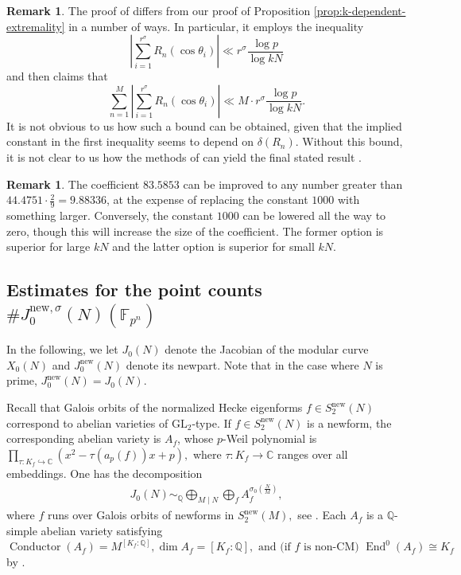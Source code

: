 \documentclass[11pt,letterpaper,reqno]{amsart}
\theoremstyle{definition}
\newtheorem{remark}[theorem]{Remark}
\numberwithin{equation}{section}
\numberwithin{figure}{section}
\numberwithin{table}{section}
\let\subsectiontemp\subsection
\renewcommand{\subsection}[1]{ 
    \subsectiontemp{#1} \hfill\vspace{0.5\linespacing} 
}
\newcommand{\nw}{\mathrm{new}}
\begin{document}
\begin{remark}
    The proof of \cite[Theorem 2.4]{Kim24} differs from our proof of Proposition \ref{prop:k-dependent-extremality} in a number of ways. In particular, it employs the inequality
    $$\left| \sum_{i = 1}^{r^\sigma} R_n(\cos \theta_i) \right| \ll r^\sigma  \frac{\log p}{\log kN}$$
    and then claims that
    $$\sum_{n = 1}^{M} \left| \sum_{i = 1}^{r^\sigma} R_n(\cos \theta_i)  \right| \ll M \cdot r^\sigma \frac{\log p}{\log kN}.$$
    It is not obvious to us how such a bound can be obtained, given that the implied constant in the first inequality seems to depend on $\delta(R_n)$. Without this bound, it is not clear to us how the methods of \cite{Kim24} can yield the final stated result \cite[Theorem 2.4]{Kim24}.
\end{remark}

\begin{remark}
    The coefficient $83.5853$ can be improved to any number greater than $44.4751 \cdot \frac{2}{9} = 9.88336$, at the expense of replacing the constant $1000$ with something larger. Conversely, the constant $1000$ can be lowered all the way to zero, though this will increase the size of the coefficient. The former option is superior for large $kN$ and the latter option is superior for small $kN.$
\end{remark}


\subsection{Estimates for the point counts \texorpdfstring{$\#J_0^{\nw,\sigma}(N)(\mathbb{F}_{p^n})$}{J-0-sigma(N)(F-p-n)}} \label{subsection:point-count}

In the following, we let $J_0(N)$ denote the Jacobian of the modular curve $X_0(N)$ and $J_0^{\nw}(N)$ denote its newpart. Note that in the case where $N$ is prime, $J_0^{\nw}(N) = J_0 (N)$.  

Recall that Galois orbits of the normalized Hecke eigenforms $f \in S_2^{\mathrm{new}}(N)$ correspond to abelian varieties of $\mathrm{GL}_2$-type. If $f \in S_2^{\mathrm{new}}(N)$ is a newform, the corresponding abelian variety is $A_f$, whose $p$-Weil polynomial is
$
\prod_{\tau : K_f \hookrightarrow \mathbb{C}}
\left(x^2-\tau(a_p(f))x+p\right),
$
where $\tau : K_f \to \mathbb{C}$ ranges over all embeddings. One has the decomposition
\begin{align}\label{eqn:composite-jacobian-decomp}
J_0(N)
\sim_{\mathbb Q}
\bigoplus_{M\mid N}
\bigoplus_{f}
A_f^{\sigma_0(\frac{N}{M})},
\end{align}
where $f$ runs over Galois orbits of newforms in $S_2^{\mathrm{new}}(M),$ see \cite{MurtySinhaDecomp} .
Each $A_f$ is a $\mathbb{Q}$-simple abelian variety satisfying
$\operatorname{Conductor}(A_f) = M^{[K_f:\mathbb{Q}]},  \dim A_f=[K_f:\mathbb{Q}], \text{ and (if $f$ is non-CM) }\operatorname{End}^0(A_f)\cong K_f$
by \cite{Ribet1980Twists}. 
\end{document}
